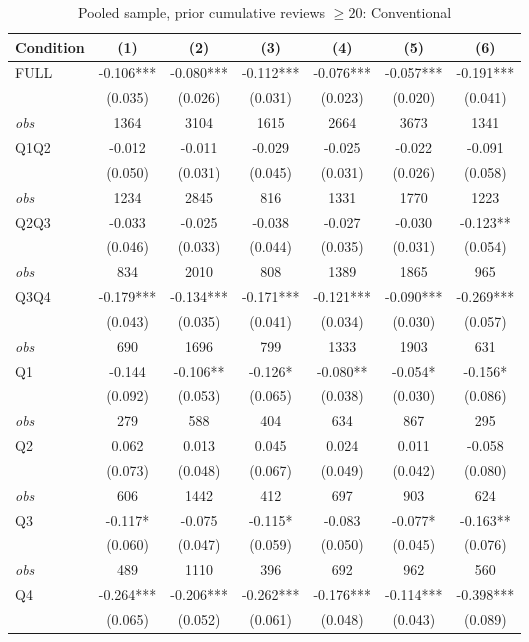 \begin{table}[!htbp]
\centering
\caption{Pooled sample, prior cumulative reviews $\geq20$: Conventional}
\begin{tabular}{lcccccc}
\toprule
Condition & (1) & (2) & (3) & (4) & (5) & (6) \\
\midrule
FULL & -0.106*** & -0.080*** & -0.112*** & -0.076*** & -0.057*** & -0.191*** \\
 & (0.035) & (0.026) & (0.031) & (0.023) & (0.020) & (0.041) \\
\textit{obs} & 1364 & 3104 & 1615 & 2664 & 3673 & 1341 \\
Q1Q2 & -0.012 & -0.011 & -0.029 & -0.025 & -0.022 & -0.091 \\
 & (0.050) & (0.031) & (0.045) & (0.031) & (0.026) & (0.058) \\
\textit{obs} & 1234 & 2845 & 816 & 1331 & 1770 & 1223 \\
Q2Q3 & -0.033 & -0.025 & -0.038 & -0.027 & -0.030 & -0.123** \\
 & (0.046) & (0.033) & (0.044) & (0.035) & (0.031) & (0.054) \\
\textit{obs} & 834 & 2010 & 808 & 1389 & 1865 & 965 \\
Q3Q4 & -0.179*** & -0.134*** & -0.171*** & -0.121*** & -0.090*** & -0.269*** \\
 & (0.043) & (0.035) & (0.041) & (0.034) & (0.030) & (0.057) \\
\textit{obs} & 690 & 1696 & 799 & 1333 & 1903 & 631 \\
Q1 & -0.144 & -0.106** & -0.126* & -0.080** & -0.054* & -0.156* \\
 & (0.092) & (0.053) & (0.065) & (0.038) & (0.030) & (0.086) \\
\textit{obs} & 279 & 588 & 404 & 634 & 867 & 295 \\
Q2 & 0.062 & 0.013 & 0.045 & 0.024 & 0.011 & -0.058 \\
 & (0.073) & (0.048) & (0.067) & (0.049) & (0.042) & (0.080) \\
\textit{obs} & 606 & 1442 & 412 & 697 & 903 & 624 \\
Q3 & -0.117* & -0.075 & -0.115* & -0.083 & -0.077* & -0.163** \\
 & (0.060) & (0.047) & (0.059) & (0.050) & (0.045) & (0.076) \\
\textit{obs} & 489 & 1110 & 396 & 692 & 962 & 560 \\
Q4 & -0.264*** & -0.206*** & -0.262*** & -0.176*** & -0.114*** & -0.398*** \\
 & (0.065) & (0.052) & (0.061) & (0.048) & (0.043) & (0.089) \\

\end{tabular}
\end{table}
